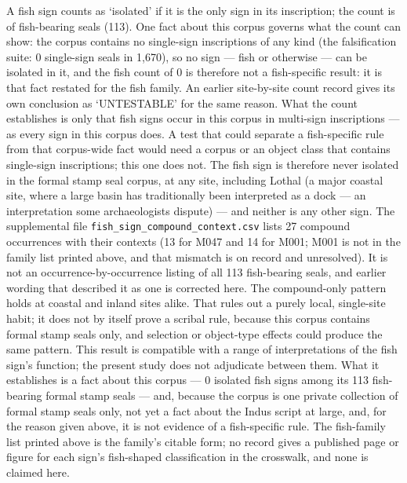 \documentclass[11pt]{article}
\newcounter{none} %
\begin{document}
A fish sign counts as `isolated' if it is the only sign in its inscription; the count is of fish-bearing seals (113). One fact about this corpus governs what the count can show: the corpus contains no single-sign inscriptions of any kind (the falsification suite: 0 single-sign seals in 1,670), so no sign --- fish or otherwise --- can be isolated in it, and the fish count of 0 is therefore not a fish-specific result: it is that fact restated for the fish family. An earlier site-by-site count record gives its own conclusion as `UNTESTABLE' for the same reason. What the count establishes is only that fish signs occur in this corpus in multi-sign inscriptions --- as every sign in this corpus does. A test that could separate a fish-specific rule from that corpus-wide fact would need a corpus or an object class that contains single-sign inscriptions; this one does not. The fish sign is therefore never isolated in the formal stamp seal corpus, at any site, including Lothal (a major coastal site, where a large basin has traditionally been interpreted as a dock --- an interpretation some archaeologists dispute) --- and neither is any other sign. The supplemental file \texttt{fish\_sign\_compound\_context.csv} lists 27 compound occurrences with their contexts (13 for M047 and 14 for M001; M001 is not in the family list printed above, and that mismatch is on record and unresolved). It is not an occurrence-by-occurrence listing of all 113 fish-bearing seals, and earlier wording that described it as one is corrected here. The compound-only pattern holds at coastal and inland sites alike. That rules out a purely local, single-site habit; it does not by itself prove a scribal rule, because this corpus contains formal stamp seals only, and selection or object-type effects could produce the same pattern. This result is compatible with a range of interpretations of the fish sign's function; the present study does not adjudicate between them. What it establishes is a fact about this corpus --- 0 isolated fish signs among its 113 fish-bearing formal stamp seals --- and, because the corpus is one private collection of formal stamp seals only, not yet a fact about the Indus script at large, and, for the reason given above, it is not evidence of a fish-specific rule. The fish-family list printed above is the family's citable form; no record gives a published page or figure for each sign's fish-shaped classification in the crosswalk, and none is claimed here.
\end{document}

